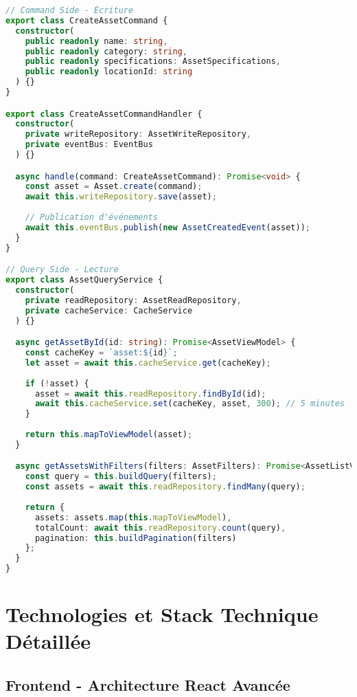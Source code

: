 \documentclass[12pt,a4paper]{report}
\begin{document}
\begin{lstlisting}[language=TypeScript, caption=Implémentation CQRS]
// Command Side - Écriture
export class CreateAssetCommand {
  constructor(
    public readonly name: string,
    public readonly category: string,
    public readonly specifications: AssetSpecifications,
    public readonly locationId: string
  ) {}
}

export class CreateAssetCommandHandler {
  constructor(
    private writeRepository: AssetWriteRepository,
    private eventBus: EventBus
  ) {}

  async handle(command: CreateAssetCommand): Promise<void> {
    const asset = Asset.create(command);
    await this.writeRepository.save(asset);
    
    // Publication d'événements
    await this.eventBus.publish(new AssetCreatedEvent(asset));
  }
}

// Query Side - Lecture
export class AssetQueryService {
  constructor(
    private readRepository: AssetReadRepository,
    private cacheService: CacheService
  ) {}

  async getAssetById(id: string): Promise<AssetViewModel> {
    const cacheKey = `asset:${id}`;
    let asset = await this.cacheService.get(cacheKey);
    
    if (!asset) {
      asset = await this.readRepository.findById(id);
      await this.cacheService.set(cacheKey, asset, 300); // 5 minutes
    }
    
    return this.mapToViewModel(asset);
  }

  async getAssetsWithFilters(filters: AssetFilters): Promise<AssetListViewModel> {
    const query = this.buildQuery(filters);
    const assets = await this.readRepository.findMany(query);
    
    return {
      assets: assets.map(this.mapToViewModel),
      totalCount: await this.readRepository.count(query),
      pagination: this.buildPagination(filters)
    };
  }
}
\end{lstlisting}

\section{Technologies et Stack Technique Détaillée}

\subsection{Frontend - Architecture React Avancée}
\end{document}
